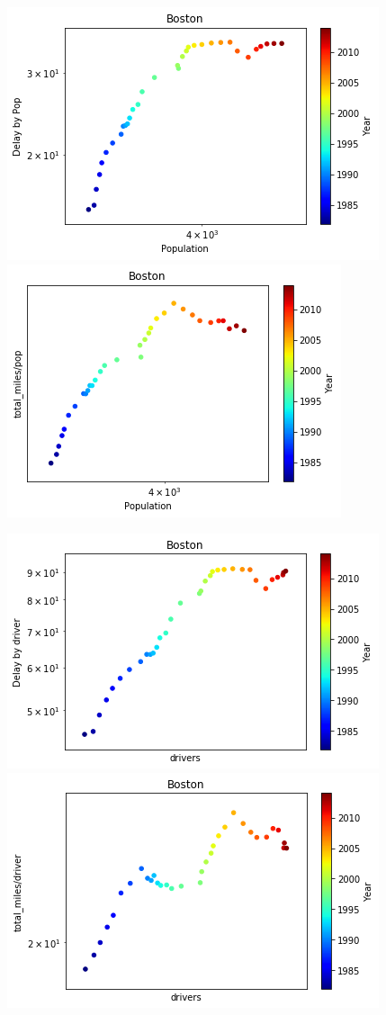 \documentclass[10pt]{article}
\begin{document}
\begin{figure}[h]
\begin{center}
\includegraphics[scale=.6]{1.png}
\includegraphics[scale=.6]{2.png}
\end{center}
\end{figure}
\pagebreak
\begin{figure}[h]
\begin{center}
\includegraphics[scale=.6]{3.png}
\includegraphics[scale=.6]{4.png}
\end{center}
\end{figure}
\end{document}
